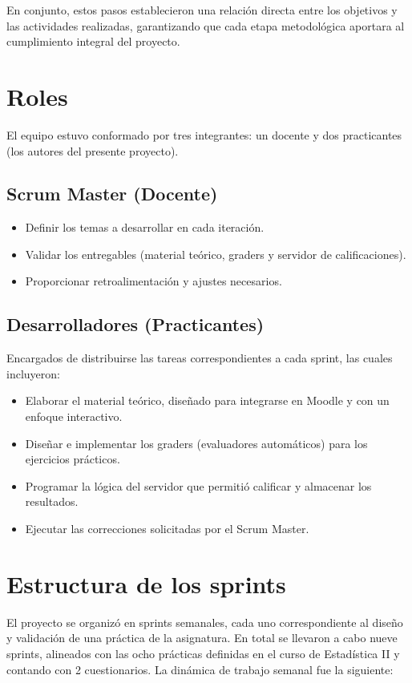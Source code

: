 \documentclass[letter,oneside,12pt,spanish]{report}
\begin{document}
En conjunto, estos pasos establecieron una relación directa entre los objetivos y las actividades realizadas, garantizando que cada etapa metodológica aportara al cumplimiento integral del proyecto.

\section{Roles}

El equipo estuvo conformado por tres integrantes: un docente y dos practicantes (los autores del presente proyecto).

\subsection*{Scrum Master (Docente)}
\begin{itemize}[leftmargin=*]
	\item Definir los temas a desarrollar en cada iteración.
	\item Validar los entregables (material teórico, graders y servidor de calificaciones).
	\item Proporcionar retroalimentación y ajustes necesarios.
\end{itemize}

\subsection*{Desarrolladores (Practicantes)}
Encargados de distribuirse las tareas correspondientes a cada sprint, las cuales incluyeron:
\begin{itemize}[leftmargin=*]
	\item Elaborar el material teórico, diseñado para integrarse en Moodle y con un enfoque interactivo.
	\item Diseñar e implementar los graders (evaluadores automáticos) para los ejercicios prácticos.
	\item Programar la lógica del servidor que permitió calificar y almacenar los resultados.
	\item Ejecutar las correcciones solicitadas por el Scrum Master.
\end{itemize}

\section{Estructura de los sprints}

El proyecto se organizó en sprints semanales, cada uno correspondiente al diseño y validación de una práctica de la asignatura. En total se llevaron a cabo nueve sprints, alineados con las ocho prácticas definidas en el curso de Estadística II y contando con 2 cuestionarios. La dinámica de trabajo semanal fue la siguiente:
\end{document}
